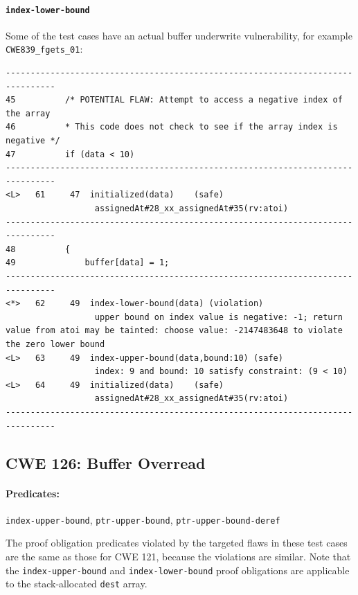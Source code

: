\documentclass[11pt]{article}
\begin{document}
\paragraph{\tt index-lower-bound}
Some of the test cases have an actual buffer underwrite vulnerability, for example
{\tt CWE839\_fgets\_01}:
\begin{tiny}
\begin{verbatim}
--------------------------------------------------------------------------------
45          /* POTENTIAL FLAW: Attempt to access a negative index of the array
46          * This code does not check to see if the array index is negative */
47          if (data < 10)
--------------------------------------------------------------------------------
<L>   61     47  initialized(data)    (safe)
                  assignedAt#28_xx_assignedAt#35(rv:atoi)
--------------------------------------------------------------------------------
48          {
49              buffer[data] = 1;
--------------------------------------------------------------------------------
<*>   62     49  index-lower-bound(data) (violation)
                  upper bound on index value is negative: -1; return value from atoi may be tainted: choose value: -2147483648 to violate the zero lower bound
<L>   63     49  index-upper-bound(data,bound:10) (safe)
                  index: 9 and bound: 10 satisfy constraint: (9 < 10)
<L>   64     49  initialized(data)    (safe)
                  assignedAt#28_xx_assignedAt#35(rv:atoi)
--------------------------------------------------------------------------------
\end{verbatim}
\end{tiny}

\subsection{CWE 126: Buffer Overread}

\paragraph{Predicates:} {\tt index-upper-bound}, {\tt ptr-upper-bound},
{\tt ptr-upper-bound-deref}

The proof obligation predicates violated by the targeted flaws in these test cases are
the same as those for CWE 121, because the  violations are similar. Note that the
{\tt index-upper-bound} and  {\tt  index-lower-bound} proof obligations are applicable
to the stack-allocated  {\tt dest} array.
\end{document}
